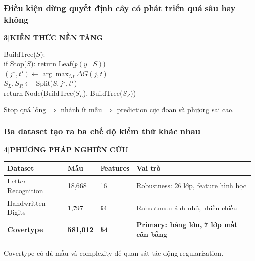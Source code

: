 \documentclass[aspectratio=169,12pt]{beamer}
\newcommand{\chaptertag}[2]{%
  \vspace{-0.16cm}%
  {\scriptsize\bfseries\textcolor{boxframe}{#1\enspace |\enspace #2}}\par
  \vspace{0.12cm}%
}
\begin{document}
\begin{frame}
  \frametitle{Điều kiện dừng quyết định cây có phát triển quá sâu hay không}
  \chaptertag{3}{KIẾN THỨC NỀN TẢNG}
  \begin{tcolorbox}[focusbox,width=0.84\textwidth,top=3mm,bottom=3mm]
    {\small\ttfamily
    BuildTree($S$):\\
    \quad if Stop($S$): return Leaf($\hat p(y\mid S)$)\\
    \quad $(j^\star,t^\star)\leftarrow\arg\max_{j,t}\Delta G(j,t)$\\
    \quad $S_L,S_R\leftarrow$ Split($S,j^\star,t^\star$)\\
    \quad return Node(BuildTree($S_L$), BuildTree($S_R$))}
  \end{tcolorbox}
  \vspace{0.28cm}
  \begin{tcolorbox}[riskbox,width=0.88\textwidth,top=2mm,bottom=2mm]
    \centering
    Stop quá lỏng $\Rightarrow$ nhánh ít mẫu $\Rightarrow$ prediction cực đoan và phương sai cao.
  \end{tcolorbox}
\end{frame}

\begin{frame}
  \frametitle{Ba dataset tạo ra ba chế độ kiểm thử khác nhau}
  \chaptertag{4}{PHƯƠNG PHÁP NGHIÊN CỨU}
  \small
  \begin{tabularx}{\textwidth}{@{}L{3.0cm}C{1.8cm}C{1.6cm}Y@{}}
    \toprule
    \textbf{Dataset} & \textbf{Mẫu} & \textbf{Features} & \textbf{Vai trò} \\
    \midrule
    Letter Recognition & 18,668 & 16 & Robustness: 26 lớp, feature hình học \\
    Handwritten Digits & 1,797 & 64 & Robustness: ảnh nhỏ, nhiều chiều \\
    \textcolor{primaryblue}{\textbf{Covertype}} & \textcolor{primaryblue}{\textbf{581,012}} & \textcolor{primaryblue}{\textbf{54}} & \textcolor{primaryblue}{\textbf{Primary: bảng lớn, 7 lớp mất cân bằng}} \\
    \bottomrule
  \end{tabularx}
  \par\vspace{0.40cm}
  \begin{center}
    Covertype có đủ mẫu và complexity để quan sát tác động regularization.
  \end{center}
\end{frame}
\end{document}
